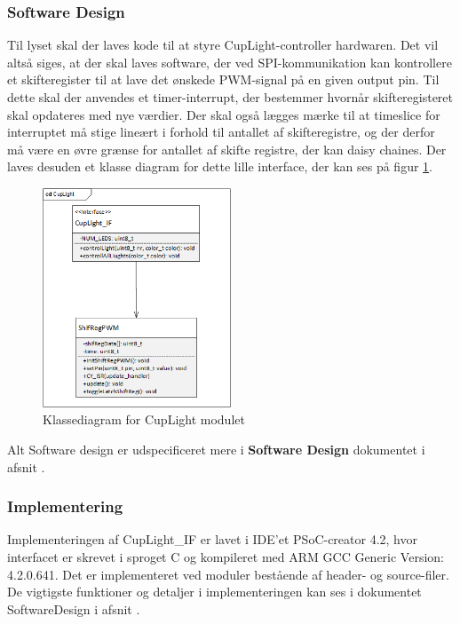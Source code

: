 \documentclass[Rapport/Rapport_main.tex]{subfiles}
\begin{document}
\subsubsection{Software Design}
Til lyset skal der laves kode til at styre CupLight-controller hardwaren. Det vil altså siges, at der skal laves software, der ved SPI-kommunikation kan kontrollere et skifteregister til at lave det ønskede PWM-signal på en given output pin. Til dette skal der anvendes et timer-interrupt, der bestemmer hvornår skifteregisteret skal opdateres med nye værdier. Der skal også lægges mærke til at timeslice for interruptet må stige lineært i forhold til antallet af skifteregistre, og der derfor må være en øvre grænse for antallet af skifte registre, der kan daisy chaines. Der laves desuden et klasse diagram for dette lille interface, der kan ses på figur \ref{fig:rap_cd_cuplight}.
\begin{figure}[H]
    \centering
    \includegraphics[width=0.5\textwidth]{Softwaredesign/CupLight_IF/graphics/CD_CupLight.png}
    \caption{Klassediagram for CupLight modulet}
    \label{fig:rap_cd_cuplight}
\end{figure}
Alt Software design er udspecificeret mere i \textbf{Software Design} dokumentet i afsnit .
\subsubsection{Implementering}
Implementeringen af CupLight\_IF er lavet i IDE'et PSoC-creator 4.2, hvor interfacet er skrevet i sproget C og kompileret med ARM GCC Generic Version: 4.2.0.641. Det er implementeret ved moduler bestående af header- og source-filer. De vigtigste funktioner og detaljer i implementeringen kan ses i dokumentet SoftwareDesign i afsnit .
\end{document}
